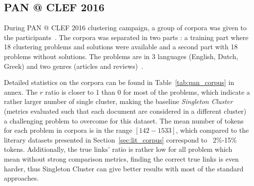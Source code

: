 \subsection{PAN @ CLEF 2016}

During PAN @ CLEF 2016 clustering campaign, a group of corpora was given to the participants~\cite{pan16_corpus}.
The corpora was separated in two parts : a training part where 18 clustering problems and solutions were available and a second part with 18 problems without solutions.
The problems are in 3 languages (English, Dutch, Greek) and two genres (articles and reviews)~\cite{pan16}.

Detailed statistics on the corpora can be found in Table~\ref{tab:pan_corpus} in annex.
The $r$ ratio is closer to 1 than 0 for most of the problems, which indicate a rather larger number of single cluster, making the baseline \textit{Singleton Cluster} (metrics evaluated such that each document are considered in a different cluster) a challenging problem to overcome for this dataset.
The mean number of tokens for each problem in corpora is in the range $[142-1533]$, which compared to the literary datasets presented in Section~\ref{sec:lit_corpus} correspond to ~2\%-15\% tokens.
Additionally, the true links' ratio is rather low for all problem which mean without strong comparison metrics, finding the correct true links is even harder, thus Singleton Cluster can give better results with most of the standard approaches.
